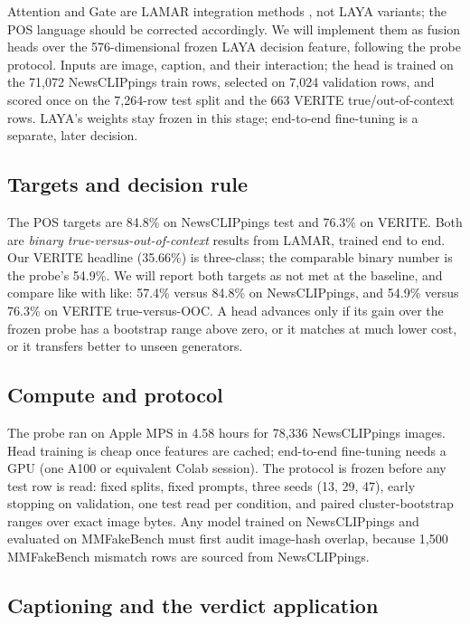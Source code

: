\documentclass[11pt]{article}
\begin{document}
Attention and Gate are LAMAR integration methods \cite{lamar}, not LAYA variants; the POS language should be corrected accordingly. We will implement them as fusion heads over the 576-dimensional frozen LAYA decision feature, following the probe protocol. Inputs are image, caption, and their interaction; the head is trained on the 71{,}072 NewsCLIPpings train rows, selected on 7{,}024 validation rows, and scored once on the 7{,}264-row test split and the 663 VERITE true/out-of-context rows. LAYA's weights stay frozen in this stage; end-to-end fine-tuning is a separate, later decision.

\subsection{Targets and decision rule}

The POS targets are 84.8\% on NewsCLIPpings test and 76.3\% on VERITE. Both are \emph{binary true-versus-out-of-context} results from LAMAR, trained end to end. Our VERITE headline (35.66\%) is three-class; the comparable binary number is the probe's 54.9\%. We will report both targets as not met at the baseline, and compare like with like: 57.4\% versus 84.8\% on NewsCLIPpings, and 54.9\% versus 76.3\% on VERITE true-versus-OOC. A head advances only if its gain over the frozen probe has a bootstrap range above zero, or it matches at much lower cost, or it transfers better to unseen generators.

\subsection{Compute and protocol}

The probe ran on Apple MPS in 4.58 hours for 78{,}336 NewsCLIPpings images. Head training is cheap once features are cached; end-to-end fine-tuning needs a GPU (one A100 or equivalent Colab session). The protocol is frozen before any test row is read: fixed splits, fixed prompts, three seeds (13, 29, 47), early stopping on validation, one test read per condition, and paired cluster-bootstrap ranges over exact image bytes. Any model trained on NewsCLIPpings and evaluated on MMFakeBench must first audit image-hash overlap, because 1{,}500 MMFakeBench mismatch rows are sourced from NewsCLIPpings.

\subsection{Captioning and the verdict application}
\end{document}
